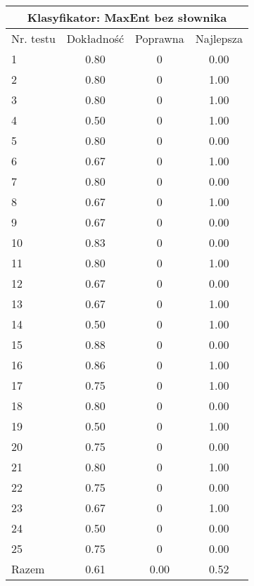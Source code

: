 \documentclass[notitlepage,leqno,fleqn,a4paper]{article}
\begin{document}
\begin{tabular}{|l|c|c|c|}
\hline
\multicolumn{4}{|c|}{Klasyfikator: MaxEnt bez słownika}\\
\hline
Nr. testu & Dokładność & Poprawna & Najlepsza\\
\hline
1 & 0.80 & 0 & 0.00 \\
2 & 0.80 & 0 & 1.00 \\
3 & 0.80 & 0 & 1.00 \\
4 & 0.50 & 0 & 1.00 \\
5 & 0.80 & 0 & 0.00 \\
6 & 0.67 & 0 & 1.00 \\
7 & 0.80 & 0 & 0.00 \\
8 & 0.67 & 0 & 1.00 \\
9 & 0.67 & 0 & 0.00 \\
10 & 0.83 & 0 & 0.00 \\
11 & 0.80 & 0 & 1.00 \\
12 & 0.67 & 0 & 0.00 \\
13 & 0.67 & 0 & 1.00 \\
14 & 0.50 & 0 & 1.00 \\
15 & 0.88 & 0 & 0.00 \\
16 & 0.86 & 0 & 1.00 \\
17 & 0.75 & 0 & 1.00 \\
18 & 0.80 & 0 & 0.00 \\
19 & 0.50 & 0 & 1.00 \\
20 & 0.75 & 0 & 0.00 \\
21 & 0.80 & 0 & 1.00 \\
22 & 0.75 & 0 & 0.00 \\
23 & 0.67 & 0 & 1.00 \\
24 & 0.50 & 0 & 0.00 \\
25 & 0.75 & 0 & 0.00 \\
\hline
Razem & 0.61 & 0.00 & 0.52 \\
\hline
\end{tabular}
\end{document}
